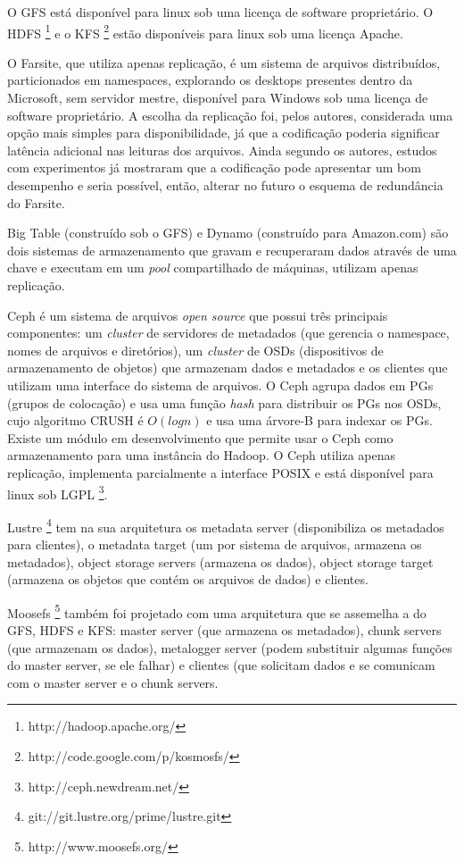 O GFS está disponível para linux sob uma licença de software proprietário. O HDFS \footnote{http://hadoop.apache.org/}  e o KFS \footnote{http://code.google.com/p/kosmosfs/} estão disponíveis para linux sob uma licença Apache. 

O Farsite, que utiliza apenas replicação, é um sistema de arquivos distribuídos, particionados em namespaces, explorando os desktops presentes dentro da Microsoft, sem servidor mestre, disponível para Windows sob uma licença de software proprietário. A escolha da replicação foi, pelos autores, considerada uma opção mais simples para disponibilidade, já que a codificação poderia significar latência adicional nas leituras dos arquivos. Ainda segundo os autores, estudos com experimentos já mostraram que a codificação pode apresentar um bom desempenho e seria possível, então, alterar no futuro o esquema de redundância do Farsite.

Big Table (construído sob o GFS) e Dynamo (construído para Amazon.com) são dois sistemas de armazenamento que gravam e recuperaram dados através de uma chave e executam em um \emph{pool} compartilhado de máquinas, utilizam apenas replicação. 

Ceph \cite{Weil:2006} é um sistema de arquivos \emph{open source} que possui três principais componentes: um \emph{cluster} de servidores de metadados (que gerencia o namespace, nomes de arquivos e diretórios), um \emph{cluster} de OSDs (dispositivos de armazenamento de objetos) que armazenam dados e metadados e os clientes que utilizam uma interface do sistema de arquivos. O Ceph agrupa dados em PGs (grupos de colocação) e usa uma função \emph{hash} para distribuir os PGs nos OSDs, cujo algoritmo CRUSH é $O(log n)$ e usa uma árvore-B para indexar os PGs. Existe um módulo em desenvolvimento que permite usar o Ceph como armazenamento para uma instância do Hadoop. O Ceph utiliza apenas replicação, implementa parcialmente a interface POSIX e está disponível para linux sob LGPL \footnote{http://ceph.newdream.net/}.

Lustre \footnote{git://git.lustre.org/prime/lustre.git} tem na sua arquitetura os metadata server (disponibiliza os metadados para clientes), o metadata target (um por sistema de arquivos, armazena os metadados), object storage servers (armazena os dados), object storage target (armazena os objetos que contém os arquivos de dados) e clientes.

Moosefs \footnote{http://www.moosefs.org/} também foi projetado com uma arquitetura que se assemelha a do GFS, HDFS e KFS: master server (que armazena os metadados), chunk servers (que armazenam os dados), metalogger server (podem substituir algumas funções do master server, se ele falhar) e clientes (que solicitam dados e se comunicam com o master server e o chunk servers. 


